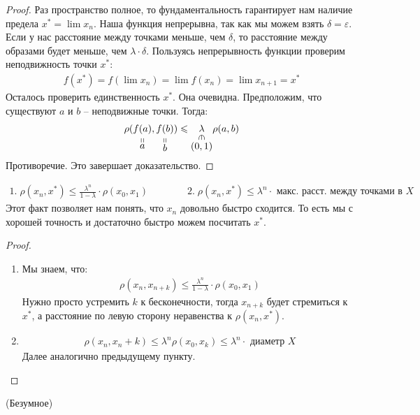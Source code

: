 \begin{proof}
    Раз пространство полное, то фундаментальность гарантирует нам наличие предела $x^* = \lim{x_n}$.
    Наша функция непрерывна, так как мы можем взять $\delta = \varepsilon$. Если у нас расстояние 
    между точками меньше, чем $\delta$, то расстояние между образами будет меньше, чем $\lambda \cdot \delta$. 
    Пользуясь непрерывность функции проверим неподвижность точки $x^*$:
    \begin{gather*}
        f(x^*) = f(\lim{x_n}) = \lim{f(x_n)} = \lim{x_{n+1}} = x^*
    \end{gather*}
    Осталось проверить единственность $x^*$. Она очевидна. Предположим, что существуют $a$ и $b$ -- неподвижные точки. Тогда:
    \begin{gather*}
        \rho(\stackbelow{f(a)}{a}, \stackbelow{f(b)}{b}) \leqslant \inbelow{\lambda}{(0, 1)} \rho(a, b)
    \end{gather*}
    Противоречие. Это завершает доказательство.
\end{proof}
\notice
\begin{gather*}
    1. \; \rho(x_n, x^*) \leqslant \frac{\lambda^n}{1 - \lambda} \cdot \rho(x_0, x_1) \qquad \qquad 
    2. \; \rho(x_n, x^*) \leqslant \lambda^n \cdot \text{ макс. расст. между точками в } X
\end{gather*} 
Этот факт позволяет нам понять, что $x_n$ довольно быстро сходится. То есть мы с хорошей точность и достаточно быстро можем посчитать $x^*$. 
\begin{proof} \quad 

    \begin{enumerate}
        \item Мы знаем, что:
        \begin{gather*}
            \rho(x_n, x_{n+k}) \leqslant \frac{\lambda^n}{1 - \lambda} \cdot \rho(x_0, x_1)
        \end{gather*}
        Нужно просто устремить $k$ к бесконечности, тогда $x_{n+k}$ будет стремиться к $x^*$, а расстояние по левую сторону неравенства к $\rho(x_n, x^*)$.
        \item \begin{gather*}
            \rho(x_n, x_n+k) \leqslant \lambda^n \rho(x_0, x_k) \leqslant \lambda^n \cdot \text{ диаметр } X
        \end{gather*}
        Далее аналогично предыдущему пункту.
    \end{enumerate}
\end{proof}
\follow \; (Безумное)

